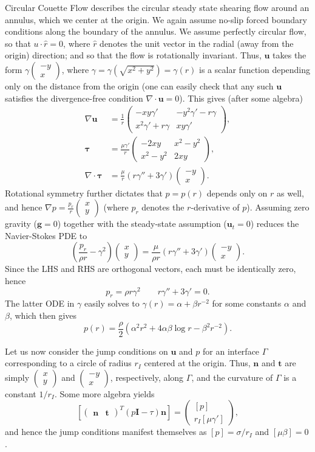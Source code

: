 \documentclass{article}
\newcommand{\q}{\quad\quad}
\newcommand{\uu}{\mathbf{u}}
\newcommand{\II}{\mathbf{I}}
\renewcommand{\gg}{\mathbf{g}}
\renewcommand{\uu}{\mathbf{u}}
\newcommand{\nn}{\mathbf{n}}
\renewcommand{\tt}{\mathbf{t}}
\newcommand{\ta}{\pmb{\tau}}
\newcommand{\mx}[1]{\begin{pmatrix} #1 \end{pmatrix}}
\begin{document}
Circular Couette Flow describes the circular steady state shearing flow around an annulus, which we center at the origin.  We again assume no-slip forced boundary conditions along the boundary of the annulus.  We assume perfectly circular flow, so that $u \cdot \hat{r} = 0$, where $\hat{r}$ denotes the unit vector in the radial (away from the origin) direction; and so that the flow is rotationally invariant.  Thus, $\uu$ takes the form $\gamma \mx{-y \\ x}$, where $\gamma = \gamma \left( \sqrt{x^2 + y^2} \right) = \gamma(r)$ is a scalar function depending only on the distance from the origin (one can easily check that any such $\uu$ satisfies the divergence-free condition $\nabla \cdot \uu = 0$).  This gives (after some algebra)
\begin{align}
\nabla \uu & = \frac{1}{r} \mx{-xy\gamma' & -y^2\gamma'-r\gamma \\ x^2\gamma'+r\gamma & xy\gamma'}, \\
\ta & = \frac{\mu \gamma'}{r} \mx{-2xy & x^2-y^2 \\ x^2-y^2 & 2xy}, \\
\nabla \cdot \ta & = \frac{\mu}{r} \left( r \gamma'' + 3 \gamma' \right) \mx{-y \\ x}.
\end{align}
Rotational symmetry further dictates that $p = p(r)$ depends only on $r$ as well, and hence $\nabla p = \frac{p_r}{r} \mx{x \\ y}$ (where $p_r$ denotes the $r$-derivative of $p$).  Assuming zero gravity ($\gg = 0$) together with the steady-state assumption ($\uu_t = 0$) reduces the Navier-Stokes PDE to
$$ \left( \frac{p_r}{\rho r} - \gamma^2 \right) \mx{x \\ y} = \frac{\mu}{\rho r} \left( r \gamma'' + 3 \gamma' \right) \mx{-y \\ x}. $$
Since the LHS and RHS are orthogonal vectors, each must be identically zero, hence
$$ p_r = \rho r \gamma^2 \q r \gamma'' + 3 \gamma' = 0. $$
The latter ODE in $\gamma$ easily solves to $\gamma(r) = \alpha + \beta r^{-2}$ for some constants $\alpha$ and $\beta$, which then gives
$$ p(r) = \frac{\rho}{2} \left( \alpha^2 r^2 + 4 \alpha \beta \log r - \beta^2 r^{-2} \right). $$

Let us now consider the jump conditions on $\uu$ and $p$ for an interface $\Gamma$ corresponding to a circle of radius $r_I$ centered at the origin.  Thus, $\nn$ and $\tt$ are simply $\mx{x \\ y}$ and $\mx{-y \\ x}$, respectively, along $\Gamma$, and the curvature of $\Gamma$ is a constant $1/r_I$.  Some more algebra yields
$$ \left[ \mx{\nn & \tt}^T \left( p\II - \tau \right) \nn \right] = \mx{[p] \\ r_I [\mu \gamma']}, $$
and hence the jump conditions manifest themselves as $[p] = \sigma/r_I$ and $[\mu \beta] = 0$.
\end{document}
